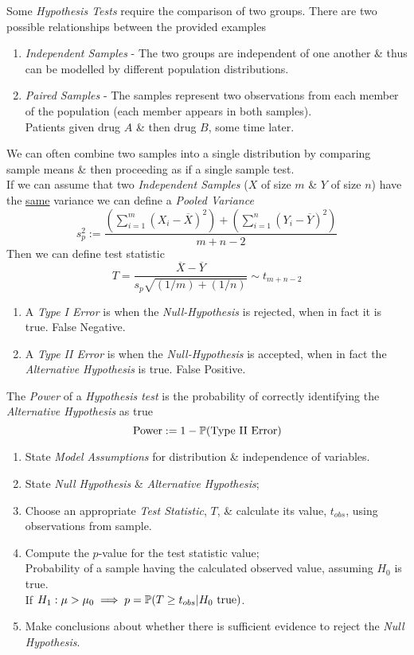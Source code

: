 \documentclass[11pt,a4paper]{article}
\begin{document}
Some \textit{Hypothesis Tests} require the comparison of two groups. There are two possible relationships between the provided examples
\begin{enumerate}
	\item \textit{Independent Samples} - The two groups are independent of one another \& thus can be modelled by different population distributions.
	\item \textit{Paired Samples} - The samples represent two observations from each member of the population (each member appears in both samples).\\
	\eg Patients given drug $A$ \& then drug $B$, some time later.
\end{enumerate}
We can often combine two samples into a single distribution by comparing sample means \& then proceeding as if a single sample test.\\

If we can assume that two \textit{Independent Samples} ($X$ of size $m$ \& $Y$ of size $n$) have the \underline{same} variance we can define a \textit{Pooled Variance}
$$s_p^2:=\frac{\left(\sum_{i=1}^m(X_i-\overline{X})^2\right)+\left(\sum_{i=1}^n(Y_i-\overline{Y})^2\right)}{m+n-2}$$
Then we can define test statistic $$T=\dfrac{\overline{X}-\overline{Y}}{s_p\sqrt{(1/m)+(1/n)}}\sim t_{m+n-2}$$

\begin{enumerate}
	\item A \textit{Type I Error} is when the \textit{Null-Hypothesis} is rejected, when in fact it is true. \ie False Negative.
	\item A \textit{Type II Error} is when the \textit{Null-Hypothesis} is accepted, when in fact the \textit{Alternative Hypothesis} is true. \ie False Positive.
\end{enumerate}

The \textit{Power} of a \textit{Hypothesis test} is the probability of correctly identifying the \textit{Alternative Hypothesis} as true
$$\mathrm{Power}:=1-\prob(\mathrm{Type\ II\ Error})$$

\begin{enumerate}[label=\arabic*)]
	\item State \textit{Model Assumptions} for distribution \& independence of variables.
	\item State \textit{Null Hypothesis} \& \textit{Alternative Hypothesis};
	\item Choose an appropriate \textit{Test Statistic}, $T$, \& calculate its value, $t_{obs}$, using observations from sample.
	\item Compute the $p$-value for the test statistic value;\\
	\ie Probability of a sample having the calculated observed value, assuming $H_0$ is true.\\
	\eg If $H_1:\mu>\mu_0\implies p=\mathbb{P}(T\geq t_{obs}|H_0\ \mathrm{true})$.
	\item Make conclusions about whether there is sufficient evidence to reject the \textit{Null Hypothesis}.
\end{enumerate}
\end{document}
